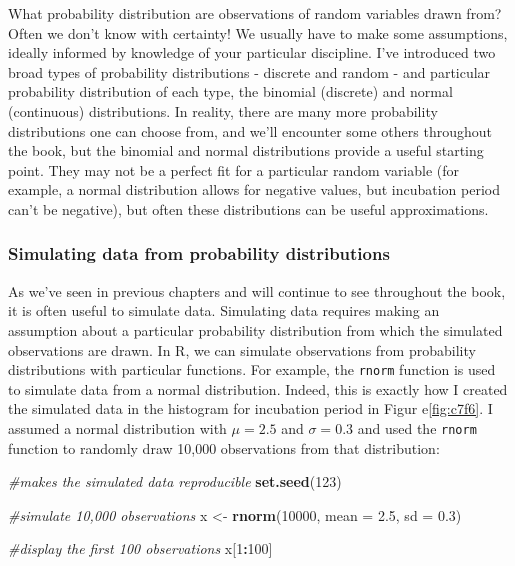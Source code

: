 \documentclass[
]{book}
\newenvironment{Shaded}{\begin{snugshade}}{\end{snugshade}}
\newcommand{\AttributeTok}[1]{\textcolor[rgb]{0.13,0.29,0.53}{#1}}
\newcommand{\CommentTok}[1]{\textcolor[rgb]{0.56,0.35,0.01}{\textit{#1}}}
\newcommand{\DecValTok}[1]{\textcolor[rgb]{0.00,0.00,0.81}{#1}}
\newcommand{\FloatTok}[1]{\textcolor[rgb]{0.00,0.00,0.81}{#1}}
\newcommand{\FunctionTok}[1]{\textcolor[rgb]{0.13,0.29,0.53}{\textbf{#1}}}
\newcommand{\NormalTok}[1]{#1}
\newcommand{\OtherTok}[1]{\textcolor[rgb]{0.56,0.35,0.01}{#1}}
\newcommand{\SpecialCharTok}[1]{\textcolor[rgb]{0.81,0.36,0.00}{\textbf{#1}}}
\begin{document}
What probability distribution are observations of random variables drawn from? Often we don't know with certainty! We usually have to make some assumptions, ideally informed by knowledge of your particular discipline. I've introduced two broad types of probability distributions - discrete and random - and particular probability distribution of each type, the binomial (discrete) and normal (continuous) distributions. In reality, there are many more probability distributions one can choose from, and we'll encounter some others throughout the book, but the binomial and normal distributions provide a useful starting point. They may not be a perfect fit for a particular random variable (for example, a normal distribution allows for negative values, but incubation period can't be negative), but often these distributions can be useful approximations.

\subsubsection{Simulating data from probability distributions}\label{simulating-data-from-probability-distributions}

As we've seen in previous chapters and will continue to see throughout the book, it is often useful to simulate data. Simulating data requires making an assumption about a particular probability distribution from which the simulated observations are drawn. In R, we can simulate observations from probability distributions with particular functions. For example, the \texttt{rnorm} function is used to simulate data from a normal distribution. Indeed, this is exactly how I created the simulated data in the histogram for incubation period in Figur e\ref{fig:c7f6}. I assumed a normal distribution with \(\mu = 2.5\) and \(\sigma = 0.3\) and used the \texttt{rnorm} function to randomly draw 10,000 observations from that distribution:

\begin{Shaded}
\begin{Highlighting}[]
\CommentTok{\#makes the simulated data reproducible}
\FunctionTok{set.seed}\NormalTok{(}\DecValTok{123}\NormalTok{)}

\CommentTok{\#simulate 10,000 observations}
\NormalTok{x }\OtherTok{\textless{}{-}} \FunctionTok{rnorm}\NormalTok{(}\DecValTok{10000}\NormalTok{, }\AttributeTok{mean =} \FloatTok{2.5}\NormalTok{, }\AttributeTok{sd =} \FloatTok{0.3}\NormalTok{)}

\CommentTok{\#display the first 100 observations}
\NormalTok{x[}\DecValTok{1}\SpecialCharTok{:}\DecValTok{100}\NormalTok{]}
\end{Highlighting}
\end{Shaded}
\end{document}
